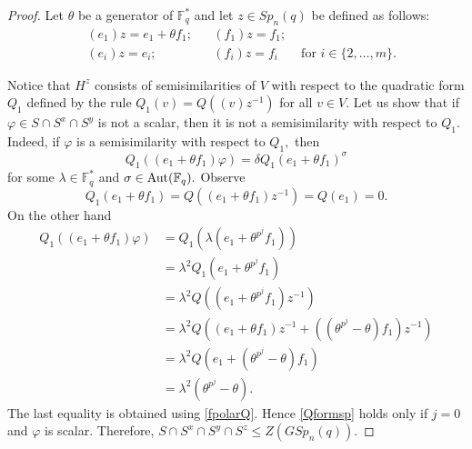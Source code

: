 \begin{proof}
Let $\theta$ be a generator of $\mathbb{F}_q^*$ and let $z \in Sp_n(q)$ be defined as follows:
\begin{align*}
&(e_1)z=e_1 + \theta f_1;  && (f_1)z=f_1;\\
&(e_i)z=e_i; && (f_i)z=f_i & \text{ for } i \in \{2, \ldots, m\}.
\end{align*}

Notice that $H^z$ consists of semisimilarities of $V$ with respect to the quadratic form $Q_1$ defined by the rule $Q_1(v)=Q((v)z^{-1})$ for all $v \in V.$ Let us show that if $\varphi \in S \cap S^x \cap S^y$ is not a scalar, then it is not a semisimilarity with respect to $Q_1.$ Indeed, if $\varphi$ is a semisimilarity with respect to $Q_1,$ then 
\begin{equation}
\label{Qformsp}
Q_1((e_1 +\theta f_1)\varphi) = \delta Q_1 (e_1 + \theta f_1)^{\sigma}
\end{equation}
for some $\lambda \in \mathbb{F}_q^*$ and $\sigma \in \mathrm{Aut} (\mathbb{F}_q).$ 
Observe $$Q_1(e_1 +\theta f_1)=Q((e_1 +\theta f_1)z^{-1})=Q(e_1)=0.$$
On the other hand 
\begingroup
\allowdisplaybreaks
\begin{align*}
Q_1((e_1 +\theta f_1)\varphi)& =  Q_1(\lambda (e_1 +\theta^{p^j} f_1)) \\ & =  \lambda^2 Q_1(e_1 +\theta^{p^j} f_1) \\ & =   \lambda^2 Q((e_1 +\theta^{p^j} f_1)z^{-1})\\ &=  \lambda^2 Q((e_1 +\theta f_1)z^{-1} + ((\theta^{p^j}- \theta)f_1)z^{-1}) \\ & =  \lambda^2 Q(e_1  + (\theta^{p^j}- \theta)f_1)\\ & =\lambda^2 (\theta^{p^j}- \theta). 
\end{align*}
\endgroup
The last equality is obtained using \eqref{fpolarQ}. Hence \eqref{Qformsp} holds only if $j=0$ and $\varphi$ is scalar. Therefore, $S \cap S^x \cap S^y \cap S^z \le Z(GSp_n(q)).$ %

\medskip



\end{proof}
